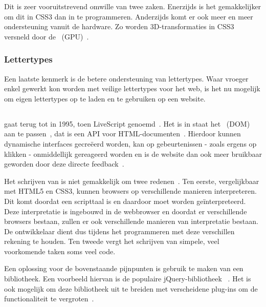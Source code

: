 Dit is zeer vooruitstrevend omwille van twee zaken. 
Enerzijds is het gemakkelijker om dit in CSS3 dan in \js{} te programmeren. 
Anderzijds komt er ook meer en meer ondersteuning vanuit de hardware. 
Zo worden 3D-transformaties in CSS3 versneld door de ~(GPU)~\cite{Hales2012,Kool2012}.

\subsubsection{Lettertypes}
Een laatste kenmerk is de betere ondersteuning van lettertypes. 
Waar vroeger enkel gewerkt kon worden met veilige lettertypes voor het web, is het nu mogelijk om eigen lettertypes op te laden en te gebruiken op een website.

\subsection{\js}
\label{ref:javascript}
\js{} gaat terug tot in 1995, toen LiveScript genoemd~\cite{McFarland2011}. 
Het is in staat het ~(DOM) aan te passen~\cite{PhilDutson2012},  dat is een API voor HTML-documenten~\cite{Hegaret2004}. 
Hierdoor kunnen dynamische interfaces gecreëerd worden, kan op gebeurtenissen - zoals ergens op klikken - onmiddellijk gereageerd worden en is de website dan ook meer bruikbaar geworden door deze directe feedback~\cite{McFarland2011}.

Het schrijven van \js{} is niet gemakkelijk om twee redenen~\cite{McFarland2011}. 
Ten eerste, vergelijkbaar met HTML5 en CSS3, kunnen browsers \js{} op verschillende manieren interpreteren. 
Dit komt doordat \js{} een scripttaal is en daardoor moet worden geïnterpreteerd.
Deze interpretatie is ingebouwd in de webbrowser en doordat er verschillende browsers bestaan, zullen er ook verschillende manieren van interpretatie bestaan.
De ontwikkelaar dient dus tijdens het programmeren met deze verschillen rekening te houden. 
Ten tweede vergt het schrijven van simpele, veel voorkomende taken soms veel code.

Een oplossing voor de bovenstaande pijnpunten is gebruik te maken van een bibliotheek. 
Een voorbeeld hiervan is de populaire jQuery-bibliotheek~\cite{JQuery2013a} . 
Het is ook mogelijk om deze bibliotheek uit te breiden met verscheidene plug-ins om de functionaliteit te vergroten~\cite{McFarland2011}.


